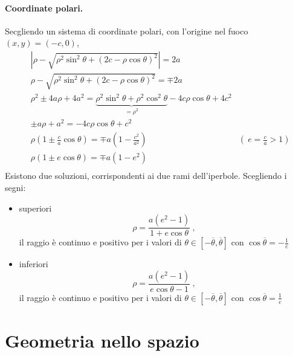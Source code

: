 \paragraph{Coordinate polari.} Secgliendo un sistema di coordinate polari, con l'origine nel fuoco $(x,y)=(-c,0)$,
\begin{equation}
\begin{aligned}
    & \left| \rho - \sqrt{\rho^2 \sin^2 \theta + (2c-\rho \cos \theta)^2 } \right| = 2a \\
    &   \rho - \sqrt{\rho^2 \sin^2 \theta + (2c-\rho \cos \theta)^2 }   = \mp 2a \\
    & \rho^2 \pm 4 a \rho + 4 a^2 = \underbrace{\rho^2 \sin^2 \theta  + \rho^2 \cos^2 \theta}_{= \rho^2} - 4 c \rho \cos \theta + 4c^2 \\
    & \pm a \rho + a^2 = - 4 c \rho \cos \theta + c^2 \\
    & \rho \left( 1 \pm \frac{c}{a} \cos \theta \right) = \mp a \left( 1 - \frac{c^2}{a^2} \right) & \left( \ e = \frac{c}{a} > 1 \right) \\
    & \rho \left( 1 \pm e \cos \theta \right) = \mp a \left( 1 - e^2 \right)  \\
\end{aligned}
\end{equation}
Esistono due soluzioni, corrispondenti ai due rami dell'iperbole. Scegliendo i segni:
\begin{itemize}
    \item superiori
        \begin{equation}
            \rho = \dfrac{a(e^2-1)}{1 + e \cos \theta} \ ,
        \end{equation}
        il raggio è continuo e positivo per i valori di $\theta \in [-\overline{\theta}, \overline{\theta}]$ con $\cos \overline{\theta} = -\frac{1}{e}$
    \item inferiori
        \begin{equation}
            \rho = \dfrac{a(e^2-1)}{e \cos \theta - 1} \ ,
        \end{equation}
        il raggio è continuo e positivo per i valori di $\theta \in [-\overline{\theta}, \overline{\theta}]$ con $\cos \overline{\theta} = \frac{1}{e}$
\end{itemize}

\section{Geometria nello spazio}

